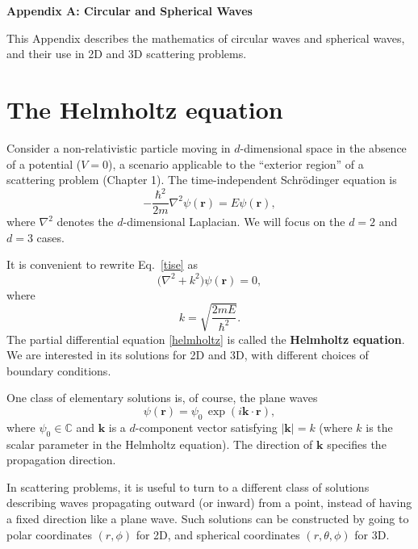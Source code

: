 \documentclass[pra,12pt]{revtex4}
\begin{document}
\begin{center}
{\large \textbf{Appendix A: Circular and Spherical Waves}}
\end{center}

This Appendix describes the mathematics of circular waves and
spherical waves, and their use in 2D and 3D scattering problems.

\section{The Helmholtz equation}

Consider a non-relativistic particle moving in $d$-dimensional space
in the absence of a potential ($V = 0$), a scenario applicable to the
``exterior region'' of a scattering problem (Chapter 1).  The
time-independent Schr\"odinger equation is
\begin{equation}
  -\frac{\hbar^2}{2m}\nabla^2 \psi(\mathbf{r}) = E \psi(\mathbf{r}),
  \label{tise}
\end{equation}
where $\nabla^2$ denotes the $d$-dimensional Laplacian.  We will focus
on the $d = 2$ and $d = 3$ cases.

It is convenient to rewrite Eq.~\eqref{tise} as
\begin{equation}
  \Big(\nabla^2 + k^2\Big) \psi(\mathbf{r}) = 0,
  \label{helmholtz}
\end{equation}
where
\begin{equation}
  k = \sqrt{\frac{2mE}{\hbar^2}}.
  \label{kparm}
\end{equation}
The partial differential equation \eqref{helmholtz} is called the
\textbf{Helmholtz equation}.  We are interested in its solutions for
2D and 3D, with different choices of boundary conditions.

One class of elementary solutions is, of course, the plane waves
\begin{equation}
  \psi(\mathbf{r}) = \psi_0 \, \exp\left(i\mathbf{k}\cdot\mathbf{r}\right),
  \label{planewaves}
\end{equation}
where $\psi_0 \in \mathbb{C}$ and $\mathbf{k}$ is a $d$-component
vector satisfying $|\mathbf{k}| = k$ (where $k$ is the scalar
parameter in the Helmholtz equation).  The direction of $\mathbf{k}$
specifies the propagation direction.

In scattering problems, it is useful to turn to a different class of
solutions describing waves propagating outward (or inward) from a
point, instead of having a fixed direction like a plane wave.  Such
solutions can be constructed by going to polar coordinates $(r, \phi)$
for 2D, and spherical coordinates $(r,\theta,\phi)$ for 3D.
\end{document}
